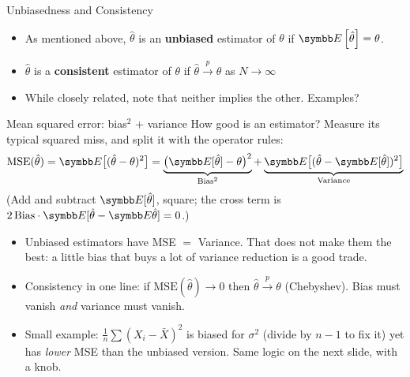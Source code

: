\documentclass[aspectratio=169,11pt]{beamer}
\begin{document}








\begin{frame}{Unbiasedness and Consistency}
\begin{itemize}
	\item As mentioned above,
	 $\hat{\theta}$ is an {\bf unbiased} estimator of $\theta$ if $\E\left[\hat{\theta}\right] = \theta$.
	 
	 \medskip
	 \item  $\hat{\theta}$ is a {\bf consistent} estimator of $\theta$ if $\hat{\theta}\overset{p}{\rightarrow}\theta$
	 as $N\rightarrow \infty$
	
	\medskip
	\item While closely related, note that neither implies the other. Examples?
\end{itemize}
\end{frame}


\begin{frame}{Mean squared error: bias$^2$ + variance}
How good is an estimator? Measure its typical squared miss, and split it with the operator rules:
\begin{align*}
	\text{MSE}(\hat\theta) = \E\big[(\hat\theta - \theta)^2\big]
	= \underbrace{\big(\E[\hat\theta] - \theta\big)^2}_{\text{Bias}^2}
	+ \underbrace{\E\big[(\hat\theta - \E[\hat\theta])^2\big]}_{\text{Variance}}
\end{align*}
(Add and subtract $\E[\hat\theta]$, square; the cross term is $2\,\text{Bias}\cdot\E[\hat\theta - \E\hat\theta] = 0$.)
\begin{itemize}
	\item Unbiased estimators have MSE $=$ Variance. That does not make them the best: a little bias
	that buys a lot of variance reduction is a good trade.
	\medskip
	\item Consistency in one line: if $\text{MSE}(\hat\theta) \to 0$ then $\hat\theta \xrightarrow{p} \theta$
	(Chebyshev). Bias must vanish \emph{and} variance must vanish.
	\medskip
	\item Small example: $\frac{1}{n}\sum(X_i - \bar X)^2$ is biased for $\sigma^2$ (divide by $n-1$ to fix it)
	yet has \emph{lower} MSE than the unbiased version. Same logic on the next slide, with a knob.
\end{itemize}
\end{frame}
\end{document}
